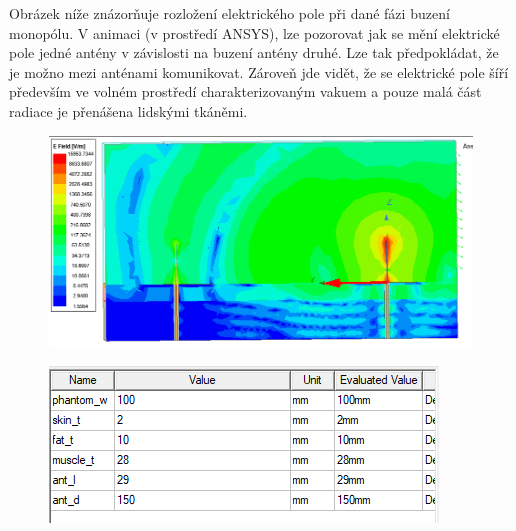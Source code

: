 \documentclass[10pt, a4paper]{article}%
\begin{document}
Obrázek níže znázorňuje rozložení elektrického pole při dané fázi buzení monopólu. V animaci (v prostředí ANSYS),
lze pozorovat jak se mění elektrické pole jedné antény v závislosti na buzení antény druhé. Lze tak předpokládat,
že je možno mezi anténami komunikovat. Zároveň jde vidět, že se elektrické pole šíří především ve volném prostředí
charakterizovaným vakuem a pouze malá část radiace je přenášena lidskými tkáněmi.
\begin{figure}[ht!]
	\centering
	\includegraphics[height = 0.3\textheight,width = 1\textwidth]{E_field_symetry.png}
\end{figure}

\begin{figure}[ht!]
	\centering
	\includegraphics[height = 0.1\textheight]{variables.png}
\end{figure}
\end{document}
